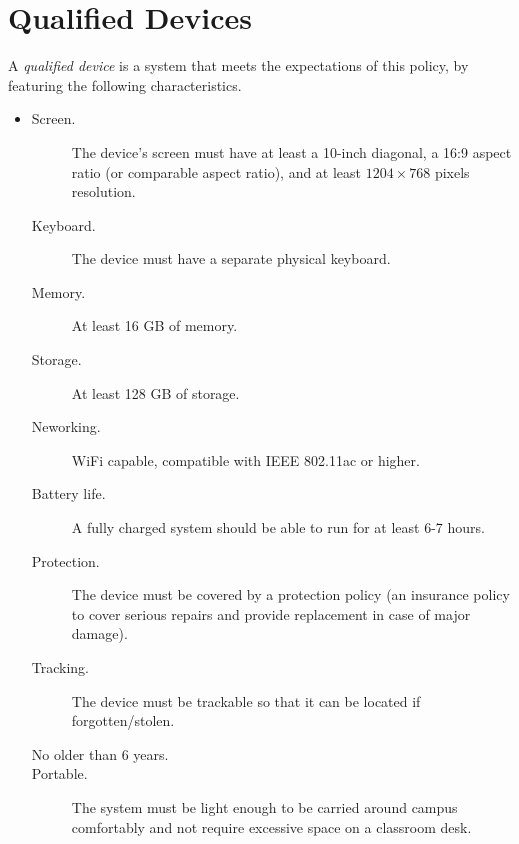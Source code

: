 \section{Qualified Devices}

A \emph{qualified device} is a system that meets the expectations of this policy, by featuring the following characteristics.

\begin{itemize}

    \item {\color{magenta}{Minimum Requirements}}
    
        \begin{description}
        
            \item [Screen.] The device's screen must have at least a 10-inch diagonal, a 16:9 aspect ratio (or comparable aspect ratio), and at least $1204\times 768$ pixels resolution.
        
            \item [Keyboard.] The device must have a separate physical keyboard. 
        
            \item[Memory.] At least 16 GB of memory.
        
            \item[Storage.] At least 128 GB of storage.
        
            \item[Neworking.] WiFi capable, compatible with IEEE 802.11ac or higher.
        
            \item[Battery life.] A fully charged system should be able to run for at least 6-7 hours.
        
            \item[Protection.] The device must be covered by a protection policy (an insurance policy to cover serious repairs and provide replacement in case of major damage).
        
            \item[Tracking.] The device must be trackable so that it can be located if forgotten/stolen.
        
            \item[No older than 6 years.]
        
            \item[Portable.] The system must be light enough to be carried around campus comfortably and not require excessive space on a classroom desk.


\end{description}
\end{itemize}

